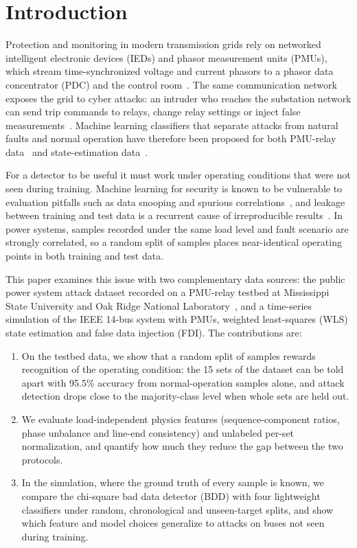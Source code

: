 \documentclass[conference]{IEEEtran}
\begin{document}
\section{Introduction}
Protection and monitoring in modern transmission grids rely on networked intelligent electronic devices (IEDs) and phasor measurement units (PMUs), which stream time-synchronized voltage and current phasors to a phasor data concentrator (PDC) and the control room~\cite{phadke2008pmu,ieee2011c37118}. The same communication network exposes the grid to cyber attacks: an intruder who reaches the substation network can send trip commands to relays, change relay settings or inject false measurements~\cite{morris2014dataset,liu2011fdi}. Machine learning classifiers that separate attacks from natural faults and normal operation have therefore been proposed for both PMU-relay data~\cite{hink2014ml,pan2015hybrid,pan2015classification} and state-estimation data~\cite{ozay2016ml,esmalifalak2017stealthy,he2017deep}.

For a detector to be useful it must work under operating conditions that were not seen during training. Machine learning for security is known to be vulnerable to evaluation pitfalls such as data snooping and spurious correlations~\cite{sommer2010closed,arp2022dos,engelen2021cicids}, and leakage between training and test data is a recurrent cause of irreproducible results~\cite{kaufman2012leakage,kapoor2023leakage}. In power systems, samples recorded under the same load level and fault scenario are strongly correlated, so a random split of samples places near-identical operating points in both training and test data.

This paper examines this issue with two complementary data sources: the public power system attack dataset recorded on a PMU-relay testbed at Mississippi State University and Oak Ridge National Laboratory~\cite{morris2014dataset}, and a time-series simulation of the IEEE 14-bus system with PMUs, weighted least-squares (WLS) state estimation and false data injection (FDI). The contributions are:
\begin{enumerate}
\item On the testbed data, we show that a random split of samples rewards recognition of the operating condition: the 15 sets of the dataset can be told apart with 95.5\% accuracy from normal-operation samples alone, and attack detection drops close to the majority-class level when whole sets are held out.
\item We evaluate load-independent physics features (sequence-component ratios, phase unbalance and line-end consistency) and unlabeled per-set normalization, and quantify how much they reduce the gap between the two protocols.
\item In the simulation, where the ground truth of every sample is known, we compare the chi-square bad data detector (BDD) with four lightweight classifiers under random, chronological and unseen-target splits, and show which feature and model choices generalize to attacks on buses not seen during training.
\end{enumerate}
\end{document}
